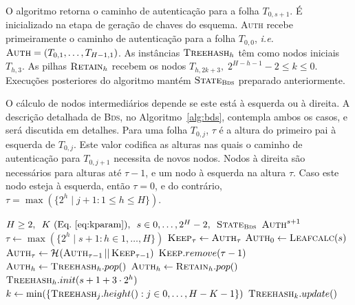 \documentclass{ufsctex/ufsctex}
\newcommand{\hash}[2][]{\mathcal{H}^{#1} (#2)}
\newcommand{\concat}{\, \vert{} \vert{} \,}
\newcommand{\bds}{\textsc{Bds}}
\begin{document}
O algoritmo retorna o caminho de autenticação para a folha $T_{0, s + 1}$. É
inicializado na etapa de geração de chaves do esquema. \textsc{Auth} recebe
primeiramente o caminho de autenticação para a folha $T_{0, 0}$, \emph{i.e.}
$\textsc{Auth} = (T_{0, 1}, \dots, T_{H -1, 1})$. As instâncias
$\textsc{Treehash}_{h}$ têm como nodos iniciais $T_{h, 3}$. As pilhas
$\textsc{Retain}_{h}$ recebem os nodos $T_{h, 2k + 3}, \; 2^{H - h - 1} - 2
\leq k \leq 0$. Execuções posteriores do algoritmo mantém
$\textsc{State}_{\bds{}}$ preparado anteriormente.

O cálculo de nodos intermediários depende se este está à esquerda ou à direita.
A descrição detalhada de \bds{}, no Algoritmo~\ref{alg:bds}, contempla ambos os
casos, e será discutida em detalhes. Para uma folha $T_{0, j}$, $\tau$ é a
altura do primeiro pai à esquerda de $T_{0, j}$. Este valor codifica as alturas
nas quais o caminho de autenticação para $T_{0, j + 1}$ necessita de novos
nodos. Nodos à direita são necessários para alturas até $\tau - 1$, e um nodo à
esquerda na altura $\tau$. Caso este nodo esteja à esquerda, então $\tau = 0$,
e do contrário, $\tau = \max(\{2^h \mid j + 1 : 1 \leq h \leq H\})$.

\begin{algorithm}
  \begin{algorithmic}
    \REQUIRE{} {$H \geq 2, \enspace K~(\text{Eq.}~\ref{eq:kparam}), \enspace
      s \in {0, \dots, 2^{H} - 2}, \enspace \textsc{State}_{\bds{}}$}
    \ENSURE{} {$\textsc{Auth}^{s + 1}$}
    \STATE{}  $\tau \leftarrow \max(\{2^h \mid s + 1 : h \in 1, \dots, H\})$
      \STATE{}  $\textsc{Keep}_{\tau} \leftarrow \textsc{Auth}_{\tau}$
    \ENDIF{}
      \STATE{}  $\textsc{Auth}_0 \leftarrow \textsc{Leafcalc}(s)$
      \STATE{}  $\textsc{Auth}_{\tau} \leftarrow
        \hash{\textsc{Auth}_{\tau - 1} \concat \textsc{Keep}_{\tau - 1}}$
      \STATE{}  $\textsc{Keep}.remove(\tau - 1)$
          \STATE{}  $\textsc{Auth}_{h} \leftarrow \textsc{Treehash}_{h}.pop()$
        \ELSE{}
          \STATE{}  $\textsc{Auth}_{h} \leftarrow \textsc{Retain}_{h}.pop()$
        \ENDIF{}
      \ENDFOR{}
          \STATE{}  $\textsc{Treehash}_{h}.init(s + 1 + 3 \cdot 2^h)$
        \ENDIF{}
      \ENDFOR{}
    \ENDIF{}
      \STATE{}  $k \leftarrow \min(\{
        \textsc{Treehash}_{j}.height() : j \in 0, \dots, H - K - 1\})$
      \STATE{}  $\textsc{Treehash}_{k}.update()$
    \ENDFOR{}
  \end{algorithmic}
  \caption{Travessia de árvores de Merkle \bds{}.}\label{alg:bds}
\end{algorithm}
\end{document}
